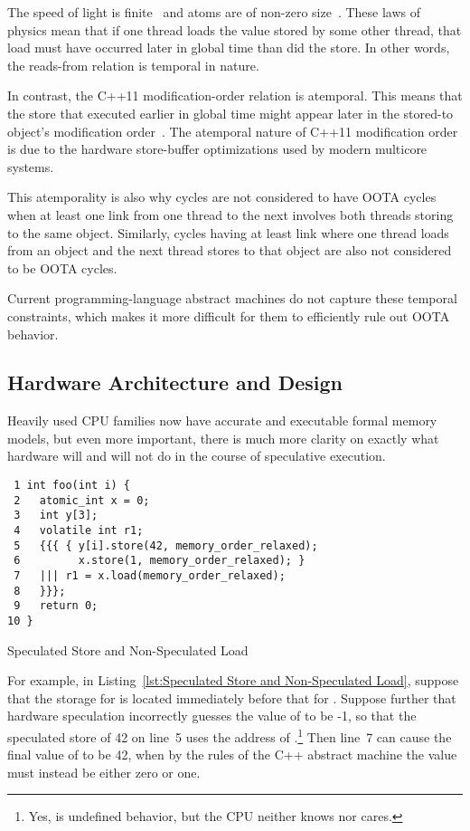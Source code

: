 \documentclass[10]{article}
\begin{document}
The speed of light is finite~\cite{OleRoemer1671SpeedOfLight}
and atoms are of non-zero size~\cite{JeanBaptistePerrin1923AtomSize}.
These laws of physics mean that if one thread loads the value
stored by some other thread, that load must have occurred later
in global time than did the store.
In other words, the reads-from relation is temporal in nature.

In contrast, the C++11 modification-order relation is atemporal.
This means that the store that executed earlier in global time
might appear later in the stored-to object's modification
order~\cite{McKenney20xxParallelProgramming}.
The atemporal nature of C++11 modification order is due to the hardware
store-buffer optimizations used by modern multicore systems.

This atemporality is also why cycles are not considered to have
OOTA cycles when at least one link from one thread to the next
involves both threads storing to the same object.
Similarly, cycles having at least link where one thread loads from an
object and the next thread stores to that object are also not considered
to be OOTA cycles.

Current programming-language abstract machines do not capture these
temporal constraints, which makes it more difficult for them to
efficiently rule out OOTA behavior.

\subsection{Hardware Architecture and Design}
\label{sec:Hardware Architecture and Design}

Heavily used CPU families now have accurate and executable formal
memory models, but even more important, there is much more clarity
on exactly what hardware will and will not do in the course of
speculative execution.

\begin{listing}[tbp]
\begin{verbatim}
 1 int foo(int i) {
 2   atomic_int x = 0;
 3   int y[3];
 4   volatile int r1;
 5   {{{ { y[i].store(42, memory_order_relaxed);
 6         x.store(1, memory_order_relaxed); }
 7   ||| r1 = x.load(memory_order_relaxed);
 8   }}};
 9   return 0;
10 }
\end{verbatim}
\caption{Speculated Store and Non-Speculated Load}
\label{lst:Speculated Store and Non-Speculated Load}
\end{listing}

For example, in Listing~\ref{lst:Speculated Store and Non-Speculated Load},
suppose that the storage for  is located immediately before that
for .
Suppose further that hardware speculation incorrectly guesses the value
of  to be -1, so that the speculated store of 42 on line~5 uses
the address of .\footnote{
	Yes,  is undefined behavior, but the CPU neither knows
	nor cares.}
Then line~7 can cause the final value of  to be 42, when
by the rules of the C++ abstract machine the value must instead be
either zero or one.
\end{document}
